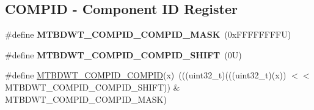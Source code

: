 \subsection*{C\+O\+M\+P\+ID -\/ Component ID Register}
\begin{DoxyCompactItemize}
\item 
\mbox{\label{group___m_t_b___register___masks_ga6b80c05493bf46a1572b3f25fda4764b}} 
\#define {\bfseries M\+T\+B\+D\+W\+T\+\_\+\+C\+O\+M\+P\+I\+D\+\_\+\+C\+O\+M\+P\+I\+D\+\_\+\+M\+A\+SK}~(0x\+F\+F\+F\+F\+F\+F\+F\+F\+U)
\item 
\mbox{\label{group___m_t_b___register___masks_ga26fe709d00d1433ca5a041dc307adfaa}} 
\#define {\bfseries M\+T\+B\+D\+W\+T\+\_\+\+C\+O\+M\+P\+I\+D\+\_\+\+C\+O\+M\+P\+I\+D\+\_\+\+S\+H\+I\+FT}~(0\+U)
\item 
\#define \mbox{\hyperlink{group___m_t_b___register___masks_ga96051e4614a093622983f79511da83b1}{M\+T\+B\+D\+W\+T\+\_\+\+C\+O\+M\+P\+I\+D\+\_\+\+C\+O\+M\+P\+ID}}(x)~(((uint32\+\_\+t)(((uint32\+\_\+t)(x)) $<$$<$ M\+T\+B\+D\+W\+T\+\_\+\+C\+O\+M\+P\+I\+D\+\_\+\+C\+O\+M\+P\+I\+D\+\_\+\+S\+H\+I\+FT)) \& M\+T\+B\+D\+W\+T\+\_\+\+C\+O\+M\+P\+I\+D\+\_\+\+C\+O\+M\+P\+I\+D\+\_\+\+M\+A\+SK)
\end{DoxyCompactItemize}
